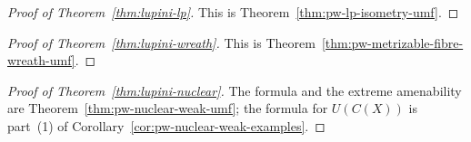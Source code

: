 \begin{proof}[Proof of Theorem~\ref{thm:lupini-lp}]
This is Theorem~\ref{thm:pw-lp-isometry-umf}.
\end{proof}

\begin{proof}[Proof of Theorem~\ref{thm:lupini-wreath}]
This is Theorem~\ref{thm:pw-metrizable-fibre-wreath-umf}.
\end{proof}

\begin{proof}[Proof of Theorem~\ref{thm:lupini-nuclear}]
The formula and the extreme amenability are Theorem~\ref{thm:pw-nuclear-weak-umf};
the formula for $U(C(X))$ is part~(1) of Corollary~\ref{cor:pw-nuclear-weak-examples}.
\end{proof}
